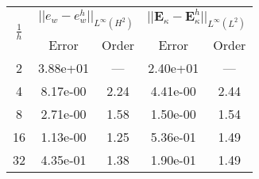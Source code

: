 \begin{table}[hp]
	\centering
	\begin{tabular}{ccccc}
		\hline 
		\multirow{2}{*}{$\frac{1}{h}$} & \multicolumn{2}{c}{$||e_w - e_w^h||_{L^{\infty}(H^2)}$}  & \multicolumn{2}{c}{$||\bm{E}_\kappa - \bm{E}_\kappa^h||_{L^{\infty}(L^2)}$}   \\ 
		& Error & Order  & Error & Order  \\
		\hline 
		2  & 3.88e+01 & ---  & 2.40e+01 & ---  \\ 
		4  & 8.17e-00 & 2.24 & 4.41e-00 & 2.44 \\ 
		8  & 2.71e-00 & 1.58 & 1.50e-00 & 1.54 \\ 
		16 & 1.13e-00 & 1.25 & 5.36e-01 & 1.49 \\ 
		32 & 4.35e-01 & 1.38 & 1.90e-01 & 1.49 \\ 
		\hline 
	\end{tabular} 
	\captionsetup{width=0.95\linewidth}
	\vspace{1mm}
	\label{tab:reskirBellDG3_CSFS}
\end{table}
